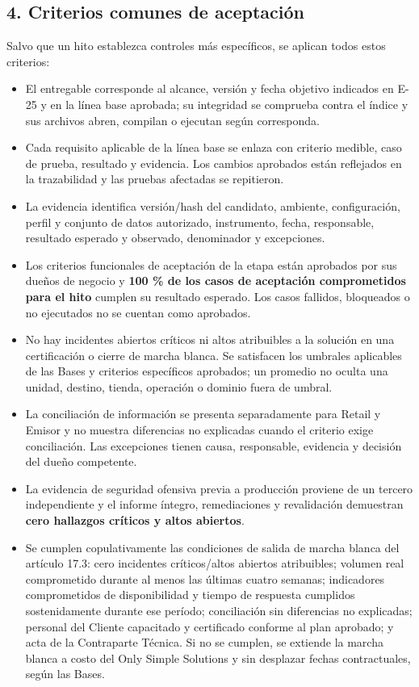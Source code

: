 \documentclass[11pt]{article}
\providecommand{\tightlist}{%
  \setlength{\itemsep}{0pt}\setlength{\parskip}{0pt}}
\begin{document}
\subsection{4. Criterios comunes de aceptación}\label{t17-criterios-comunes-de-aceptaciuxf3n}

Salvo que un hito establezca controles más específicos, se aplican todos estos criterios:

\begin{itemize}
\tightlist
\item
  El entregable corresponde al alcance, versión y fecha objetivo indicados en E-25 y en la línea base aprobada; su integridad se comprueba contra el índice y sus archivos abren, compilan o ejecutan según corresponda.
\item
  Cada requisito aplicable de la línea base se enlaza con criterio medible, caso de prueba, resultado y evidencia. Los cambios aprobados están reflejados en la trazabilidad y las pruebas afectadas se repitieron.
\item
  La evidencia identifica versión/hash del candidato, ambiente, configuración, perfil y conjunto de datos autorizado, instrumento, fecha, responsable, resultado esperado y observado, denominador y excepciones.
\item
  Los criterios funcionales de aceptación de la etapa están aprobados por sus dueños de negocio y \textbf{100 \% de los casos de aceptación comprometidos para el hito} cumplen su resultado esperado. Los casos fallidos, bloqueados o no ejecutados no se cuentan como aprobados.
\item
  No hay incidentes abiertos críticos ni altos atribuibles a la solución en una certificación o cierre de marcha blanca. Se satisfacen los umbrales aplicables de las Bases y criterios específicos aprobados; un promedio no oculta una unidad, destino, tienda, operación o dominio fuera de umbral.
\item
  La conciliación de información se presenta separadamente para Retail y Emisor y no muestra diferencias no explicadas cuando el criterio exige conciliación. Las excepciones tienen causa, responsable, evidencia y decisión del dueño competente.
\item
  La evidencia de seguridad ofensiva previa a producción proviene de un tercero independiente y el informe íntegro, remediaciones y revalidación demuestran \textbf{cero hallazgos críticos y altos abiertos}.
\item
  Se cumplen copulativamente las condiciones de salida de marcha blanca del artículo 17.3: cero incidentes críticos/altos abiertos atribuibles; volumen real comprometido durante al menos las últimas cuatro semanas; indicadores comprometidos de disponibilidad y tiempo de respuesta cumplidos sostenidamente durante ese período; conciliación sin diferencias no explicadas; personal del Cliente capacitado y certificado conforme al plan aprobado; y acta de la Contraparte Técnica. Si no se cumplen, se extiende la marcha blanca a costo del Only Simple Solutions y sin desplazar fechas contractuales, según las Bases.
\end{itemize}
\end{document}

